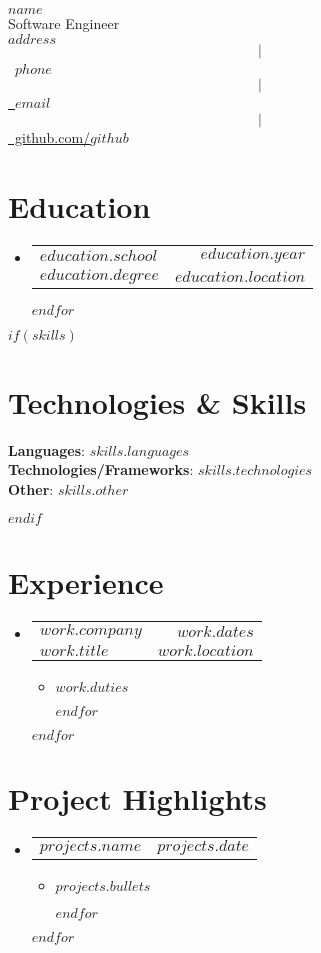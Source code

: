 \documentclass[letterpaper,11pt]{article}
\makeatletter
\newcommand{\resumeItem}[1]{
  \item{
    {#1 \vspace{-2pt}}
  }
}
\newcommand{\resumeSubheading}[4]{
  \vspace{-2pt}\item
    \begin{tabular*}{1.0\textwidth}[t]{l@{\extracolsep{\fill}}r}
      \textbf{#1} & \textbf{\small #2} \\
      \textit{\small#3} & \textit{\small #4} \\
    \end{tabular*}\vspace{-7pt}
}
\newcommand{\resumeProjectHeading}[2]{
    \item
    \begin{tabular*}{1.001\textwidth}{l@{\extracolsep{\fill}}r}
      \small#1 & \textbf{\small #2}\\
    \end{tabular*}\vspace{-7pt}
}
\newcommand{\resumeSubHeadingListStart}{\begin{itemize}[leftmargin=0.0in, label={}]}
\newcommand{\resumeSubHeadingListEnd}{\end{itemize}}
\newcommand{\resumeItemListStart}{\begin{itemize}}
\newcommand{\resumeItemListEnd}{\end{itemize}\vspace{-5pt}}
\makeatother
\begin{document}
\begin{center}
    {\Huge \scshape $name$} \\ \vspace{5pt}
    {\Large Software Engineer} \\ \vspace{5pt}
	\small $address$ $$|$$ \small \raisebox{-0.1\height}\ $phone$ ~ $$|$$ \href{mailto:$email$}{\raisebox{-0.2\height}\  $email$} ~ $$|$$
    \href{https://github.com/$github$}{\raisebox{-0.2\height}\ github.com/$github$}
    \vspace{-8pt}
\end{center}


\section{Education}
  \resumeSubHeadingListStart
  $for(education)$  
	\resumeSubheading
	{$education.school$}{$education.year$}
	{$education.degree$}{$education.location$}
  $endfor$
  \resumeSubHeadingListEnd


$if(skills)$
\section{Technologies \& Skills}
\begin{itemize}[leftmargin=0.15in, label={}]
    \small{\item{
    \textbf{Languages}{: $skills.languages$} \\
    \textbf{Technologies/Frameworks}{: $skills.technologies$} \\
    \textbf{Other}{: $skills.other$} \\
    }}
\end{itemize}
\vspace{-20pt}
$endif$



\section{Experience}
  \resumeSubHeadingListStart
  $for(work)$
    \resumeSubheading{$work.company$}{$work.dates$}{$work.title$}{$work.location$}
    \resumeItemListStart
    $for(work.duties)$
      \resumeItem{$work.duties$}
    $endfor$
    \resumeItemListEnd
  $endfor$
  \resumeSubHeadingListEnd


\section{Project Highlights}
    \vspace{-5pt}
    \resumeSubHeadingListStart
    $for(projects)$
      \resumeProjectHeading
        {\textbf{$projects.name$}}{$projects.date$}
        \resumeItemListStart
        $for(projects.bullets)$
          \resumeItem{$projects.bullets$}
        $endfor$
        \resumeItemListEnd
        \vspace{-13pt}
    $endfor$
    \resumeSubHeadingListEnd
\vspace{5pt}
\end{document}
